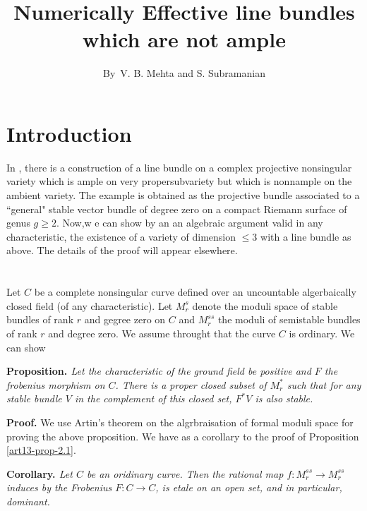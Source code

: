 \title{Numerically Effective line bundles which are not ample}

\author{By~V. B. Mehta and S. Subramanian}


\date{}
\maketitle

\section{Introduction}\label{art13-sec-1}
In \cite{art13-key6}, there is a construction of a line bundle on a complex projective nonsingular variety which is ample on very propersubvariety but which is nonnample on the ambient variety. The example is obtained as the projective bundle associated to a ``general" stable vector bundle of degree zero on a compact Riemann surface of genus $g \geq 2$. Now,w e can show by an an algebraic argument valid in any characteristic, the existence of a variety of dimension $\leq 3$ with a line bundle as above. The details of the proof will appear elsewhere.

\section{}\label{art13-sec-2}
Let $C$ be a complete  nonsingular curve defined over an uncountable algerbaically closed field (of any characteristic). Let $M_{r}^{s}$ denote the moduli space of stable bundles of rank $r$ and gegree zero on $C$ and $M_{r}^{ss}$ the moduli of semistable bundles of rank $r$ and degree zero. We assume throught that the curve $C$ is ordinary. We can show

\medskip
\noindent
{\bfseries {} Proposition. \label{art13-prop-2.1}} \textit{Let the characteristic of the ground field be positive and $F$ the frobenius morphism on $C$. There is a proper closed subset of $M_{r}^{*}$ such that for any stable bundle $V$ in the complement of this closed set, $F^{*}V$ is also stable.}

\medskip
\noindent
{\bfseries Proof.} We use Artin's theorem on the algrbraisation of formal moduli space for proving the above proposition. We have as a corollary to the proof of Proposition \eqref{art13-prop-2.1}.

\medskip
\noindent
{\bfseries {} Corollary. \label{art13-coro-2.1.1}} \textit{Let $C$ be an oridinary curve. Then the rational map $f: M_{r}^{ss} \rightarrow M_{r}^{ss}$ induces by the Frobenius $F: C \rightarrow C$, is etale on an open set, and in particular, dominant.}


